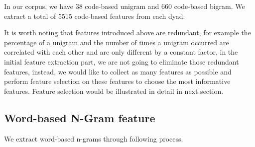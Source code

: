 \documentclass[11pt]{article} %
\begin{document}
In our corpus, we have 38 code-based unigram and 660 code-based bigram. We extract a total of 5515 code-based features from each dyad.

It is worth noting that features introduced above are redundant, for example the percentage of a unigram and the number of times a unigram occurred are correlated with each other and are only different by a constant factor, in the initial feature extraction part, we are not going to eliminate those redundant features, instead, we would like to collect as many features as possible and perform feature selection on these features to choose the most informative features. Feature selection would be illustrated in detail in next section.

\subsection{Word-based N-Gram feature}
We extract word-based n-grams through following process.
\end{document}
